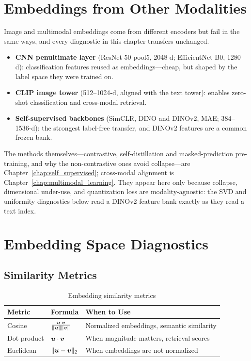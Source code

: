 \section{Embeddings from Other Modalities}
\label{sec:image_embeddings}

Image and multimodal embeddings come from different encoders but fail in the same ways, and every diagnostic in this chapter transfers unchanged.

\begin{itemize}
    \item \textbf{CNN penultimate layer} (ResNet-50 pool5, 2048-d; EfficientNet-B0, 1280-d): classification features reused as embeddings---cheap, but shaped by the label space they were trained on.
    \item \textbf{CLIP image tower} (512--1024-d, aligned with the text tower): enables zero-shot classification and cross-modal retrieval.
    \item \textbf{Self-supervised backbones} (SimCLR, DINO and DINOv2, MAE; 384--1536-d): the strongest label-free transfer, and DINOv2 features are a common frozen bank.
\end{itemize}

The methods themselves---contrastive, self-distillation and masked-prediction pre-training, and why the non-contrastive ones avoid collapse---are Chapter~\ref{chap:self_supervised}; cross-modal alignment is Chapter~\ref{chap:multimodal_learning}. They appear here only because collapse, dimensional under-use, and quantization loss are modality-agnostic: the SVD and uniformity diagnostics below read a DINOv2 feature bank exactly as they read a text index.

\section{Embedding Space Diagnostics}
\label{sec:embedding_properties}

\subsection{Similarity Metrics}

\begin{table}[H]
\centering
\caption{Embedding similarity metrics}
\begin{tabularx}{\textwidth}{lXX}
\toprule
\textbf{Metric} & \textbf{Formula} & \textbf{When to Use} \\
\midrule
Cosine & $\frac{\bm{u} \cdot \bm{v}}{\|\bm{u}\| \|\bm{v}\|}$ & Normalized embeddings, semantic similarity \\
Dot product & $\bm{u} \cdot \bm{v}$ & When magnitude matters, retrieval scores \\
Euclidean & $\|\bm{u} - \bm{v}\|_2$ & When embeddings are not normalized \\
\bottomrule
\end{tabularx}
\end{table}

